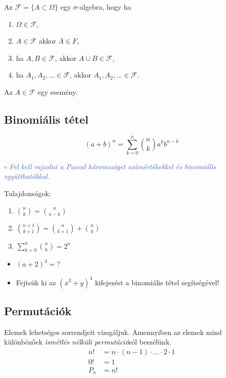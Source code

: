 \documentclass[a4paper]{article}
\newenvironment{task}[1]
{\noindent\textcolor{RoyalBlue}{$\circ$ \textit{#1}}

\smallskip

\color{Gray}

}{\bigskip}
\newenvironment{comment}
{\color{Green}}{\bigskip}
\begin{document}
\begin{comment}
\noindent Az $\mathcal{F} = \{A \subset \Omega \}$ egy $\sigma$-algebra, hogy ha
\begin{enumerate}
\item $\Omega \in \mathcal{F}$,
\item $A \in \mathcal{F}$ akkor $\overline{A} \in F$,
\item ha $A, B \in \mathcal{F}$, akkor $A \cup B \in \mathcal{F}$,
\item ha $A_1, A_2, \ldots \in \mathcal{F}$, akkor $A_1, A_2, \ldots \in \mathcal{F}$.
\end{enumerate}
Az $A \in \mathcal{F}$ egy esemény.

\end{comment}

\subsection{Binomiális tétel}

\[
\displaystyle
(a + b)^n = \sum_{k=0}^{n} \binom{n}{k} a^k b^{n - k}
\]

\begin{task}{
Fel kell rajzolni a Pascal háromszöget számértékekkel és binomiális együtthatókkal.
}
\end{task}

\noindent Tulajdonságok:
\begin{enumerate}
\item $\displaystyle \binom{n}{k} = \binom{n}{n - k}$
\item $\displaystyle \binom{n+1}{k+1} = \binom{n}{k+1} + \binom{n}{k}$
\item $\displaystyle \sum_{k=0}^{n} \binom{n}{k} = 2^n$
\end{enumerate}

\begin{itemize}
\item $(a + 2)^3 = ?$
\item Fejtsük ki az $(x^3 + y)^4$ kifejezést a binomiális tétel segítségével!
\end{itemize}

\subsection{Permutációk}

Elemek lehetséges sorrendjeit vizsgáljuk.
Amennyiben az elemek mind különbözőek \textit{ismétlés nélküli permutáció}ról beszélünk.
\begin{align*}
n! &= n \cdot (n - 1) \cdot \ldots \cdot 2 \cdot 1 \\
0! &= 1 \\
P_n &= n! \\
\end{align*}
\end{document}
